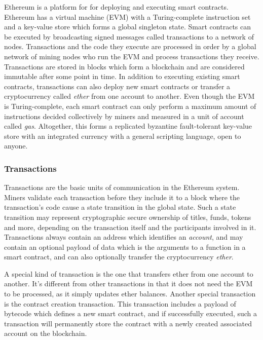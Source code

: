 Ethereum \cite{wood2018ethereum} is a platform for for deploying and executing smart contracts. Ethereum has a virtual machine (EVM) with a Turing-complete instruction set and a key-value store which forms a global singleton state. Smart contracts can be executed by broadcasting signed messages called transactions to a network of nodes. Transactions and the code they execute are processed in order by a global network of mining nodes who run the EVM and process transactions they receive. Transactions are stored in blocks which form a blockchain and are considered immutable after some point in time. In addition to executing existing smart contracts, transactions can also deploy new smart contracts or transfer a cryptocurrency called \emph{ether} from one account to another. Even though the EVM is Turing-complete, each smart contract can only perform a maximum amount of instructions decided collectively by miners and measured in a unit of account called \emph{gas}. Altogether, this forms a replicated byzantine fault-tolerant key-value store with an integrated currency with a general scripting language, open to anyone.

\subsubsection{Transactions}
Transactions are the basic units of communication in the Ethereum system. Miners validate each transaction before they include it to a block where the transaction's code cause a state transition in the global state. Such a state transition may represent cryptographic secure ownership of titles, funds, tokens and more, depending on the transaction itself and the participants involved in it. Transactions always contain an address which identifies an \emph{account}, and may contain an optional payload of data which is the arguments to a function in a smart contract, and can also optionally transfer the cryptocurrency \emph{ether}. 

A special kind of transaction is the one that transfers ether from one account to another. It's different from other transactions in that it does not need the EVM to be processed, as it simply updates ether balances. Another special transaction is the contract creation transaction. This transaction includes a payload of bytecode which defines a new smart contract, and if successfully executed, such a transaction will permanently store the contract with a newly created associated account on the blockchain.


